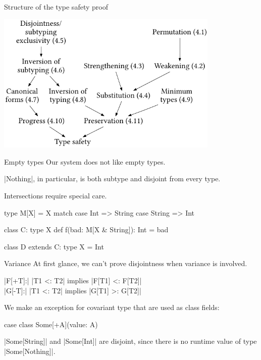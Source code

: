 \documentclass[10pt]{beamer}
\newenvironment{slide}[2][]
  {\begin{frame}[fragile,environment=slide,#1]{#2}}
  {\end{frame}}
\begin{document}
\begin{slide}{Structure of the type safety proof}
\begin{center}
\includegraphics[width=0.8\textwidth]{figures/FMProofStructure.pdf}
\end{center}
\end{slide}

\begin{slide}{Empty types}
Our system does not like empty types.

|Nothing|, in particular, is both subtype and disjoint from every type.

Intersections require special care.

\pause

\begin{code}
type M[X] = X match
  case Int => String
  case String => Int

class C:
  type X
  def f(bad: M[X & String]): Int = bad

class D extends C:
  type X = Int
\end{code}
\end{slide}

\begin{slide}{Variance}
At first glance, we can't prove disjointness when variance is involved.

|F[+T]:| \quad |T1 <: T2| \quad implies \quad |F[T1] <: F[T2]|\\
|G[-T]:| \quad |T1 <: T2| \quad implies \quad |G[T1] >: G[T2]|
\pause

We make an exception for covariant type that are used as class fields:
\begin{code}
case class Some[+A](value: A)
\end{code}

|Some[String]| and |Some[Int]| are disjoint, since there is no runtime value of type |Some[Nothing]|.

\end{slide}
\end{document}
